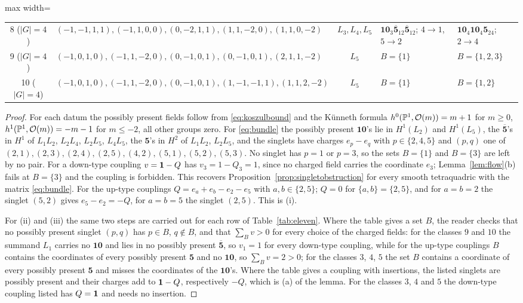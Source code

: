 \begin{table}[t]
\begin{adjustbox}{max width=\linewidth}
\begin{tabular}{@{}clcll@{}}
8 ($|G|=4$) & $(-1,-1,1,1),(-1,1,0,0),(0,-2,1,1),(1,1,-2,0),(1,1,0,-2)$ & $L_3,L_4,L_5$ & $\mathbf{10}_3\overline{\mathbf5}_{12}\overline{\mathbf5}_{12}$; $4\to1$, $5\to2$ & $\mathbf{10}_4\mathbf{10}_4\mathbf5_{24}$; $2\to4$\\
9 ($|G|=4$) & $(-1,0,1,0),(-1,1,-2,0),(0,-1,0,1),(0,-1,0,1),(2,1,1,-2)$ & $L_5$ & $B=\{1\}$ & $B=\{1,2,3\}$\\
10 ($|G|=4$) & $(-1,0,1,0),(-1,1,-2,0),(0,-1,0,1),(1,-1,-1,1),(1,1,2,-2)$ & $L_5$ & $B=\{1\}$ & $B=\{1,2\}$\\
\bottomrule
\end{tabular}
\end{adjustbox}
\end{table}

\begin{proof}
For each datum the possibly present fields follow from
\eqref{eq:koszulbound} and the K\"unneth formula
$h^0(\mathbb{P}^1,\mathcal{O}(m))=m+1$ for $m\ge0$, $h^1(\mathbb{P}^1,\mathcal{O}(m))=-m-1$ for $m\le-2$,
all other groups zero. For \eqref{eq:bundle} the possibly present
$\mathbf{10}$'s lie in $H^1(L_2)$ and $H^1(L_5)$, the
$\overline{\mathbf5}$'s in $H^1$ of $L_1L_2$, $L_2L_4$, $L_2L_5$, $L_4L_5$,
the $\mathbf5$'s in $H^2$ of $L_1L_2$, $L_2L_5$, and the singlets have
charges $e_p-e_q$ with $p\in\{2,4,5\}$ and $(p,q)$ one of
$(2,1),(2,3),(2,4),(2,5),(4,2),(5,1),(5,2),(5,3)$. No singlet has $p=1$ or
$p=3$, so the sets $B=\{1\}$ and $B=\{3\}$ are left by no pair. For a
down-type coupling $v=\mathbf{1}-Q$ has $v_3=1-Q_3=1$, since no charged field
carries the coordinate $e_3$; Lemma~\ref{lem:flow}(b) fails at $B=\{3\}$
and the coupling is forbidden. This recovers
Proposition~\ref{prop:singletobstruction} for every smooth tetraquadric
with the matrix \eqref{eq:bundle}. For the up-type couplings
$Q=e_a+e_b-e_2-e_5$ with $a,b\in\{2,5\}$; $Q=0$ for $\{a,b\}=\{2,5\}$, and
for $a=b=2$ the singlet $(5,2)$ gives $e_5-e_2=-Q$, for $a=b=5$ the singlet
$(2,5)$. This is (i).

For (ii) and (iii) the same two steps are carried out for each row of
Table~\ref{tab:eleven}. Where the table gives a set $B$, the reader
checks that no possibly present singlet $(p,q)$ has $p\in B$, $q\notin B$,
and that $\sum_Bv>0$ for every choice of the charged fields: for the
classes $9$ and $10$ the summand $L_1$ carries no $\mathbf{10}$ and lies in
no possibly present $\overline{\mathbf5}$, so $v_1=1$ for every down-type
coupling, while for the up-type couplings $B$ contains the coordinates of
every possibly present $\mathbf 5$ and no $\mathbf{10}$, so
$\sum_Bv=2>0$; for the classes $3$, $4$, $5$ the set $B$ contains a
coordinate of every possibly present $\mathbf5$ and misses the
coordinates of the $\mathbf{10}$'s. Where the table gives a coupling with
insertions, the listed singlets are possibly present and their charges
add to $\mathbf{1}-Q$, respectively $-Q$, which is (a) of the lemma. For the
classes $3$, $4$ and $5$ the down-type coupling listed has $Q=\mathbf{1}$ and
needs no insertion.
\end{proof}

